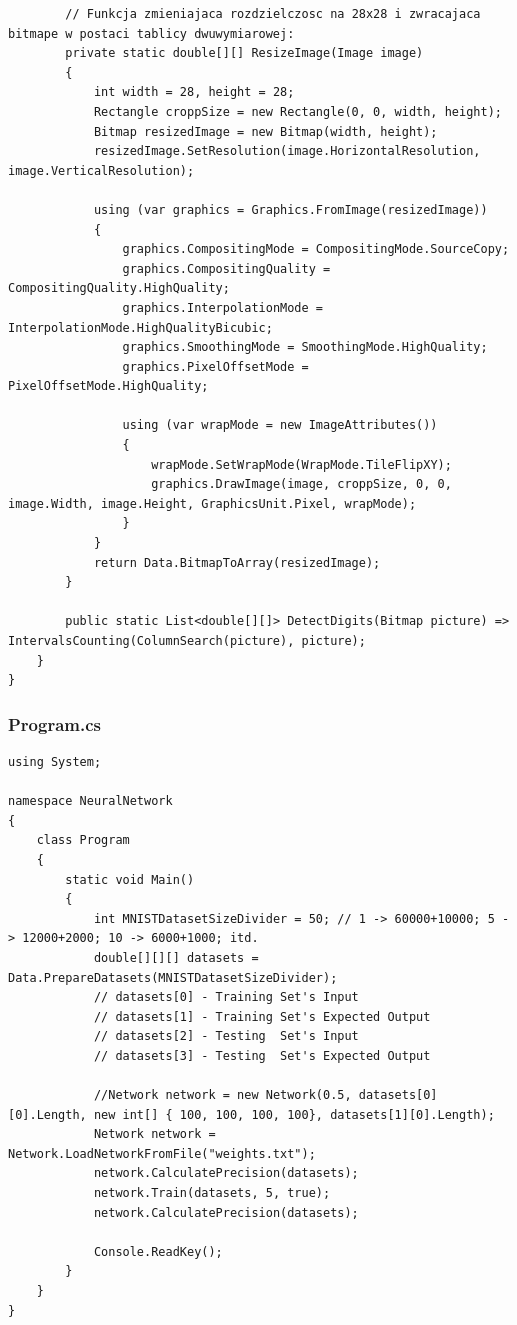 \documentclass[12pt,a4paper]{article}
\begin{document}
\begin{lstlisting}
        // Funkcja zmieniajaca rozdzielczosc na 28x28 i zwracajaca bitmape w postaci tablicy dwuwymiarowej:
        private static double[][] ResizeImage(Image image)
        {
            int width = 28, height = 28;
            Rectangle croppSize = new Rectangle(0, 0, width, height);
            Bitmap resizedImage = new Bitmap(width, height);
            resizedImage.SetResolution(image.HorizontalResolution, image.VerticalResolution);

            using (var graphics = Graphics.FromImage(resizedImage))
            {
                graphics.CompositingMode = CompositingMode.SourceCopy;
                graphics.CompositingQuality = CompositingQuality.HighQuality;
                graphics.InterpolationMode = InterpolationMode.HighQualityBicubic;
                graphics.SmoothingMode = SmoothingMode.HighQuality;
                graphics.PixelOffsetMode = PixelOffsetMode.HighQuality;

                using (var wrapMode = new ImageAttributes())
                {
                    wrapMode.SetWrapMode(WrapMode.TileFlipXY);
                    graphics.DrawImage(image, croppSize, 0, 0, image.Width, image.Height, GraphicsUnit.Pixel, wrapMode);
                }
            }
            return Data.BitmapToArray(resizedImage);
        }

        public static List<double[][]> DetectDigits(Bitmap picture) => IntervalsCounting(ColumnSearch(picture), picture);
    }
}
	\end{lstlisting}
	

\newpage	
	\subsubsection*{Program.cs}
	\begin{lstlisting}
using System;

namespace NeuralNetwork
{
    class Program
    {
        static void Main()
        {
            int MNISTDatasetSizeDivider = 50; // 1 -> 60000+10000; 5 -> 12000+2000; 10 -> 6000+1000; itd.
            double[][][] datasets = Data.PrepareDatasets(MNISTDatasetSizeDivider);
            // datasets[0] - Training Set's Input
            // datasets[1] - Training Set's Expected Output
            // datasets[2] - Testing  Set's Input
            // datasets[3] - Testing  Set's Expected Output

            //Network network = new Network(0.5, datasets[0][0].Length, new int[] { 100, 100, 100, 100}, datasets[1][0].Length);
            Network network = Network.LoadNetworkFromFile("weights.txt");
            network.CalculatePrecision(datasets);
            network.Train(datasets, 5, true);
            network.CalculatePrecision(datasets);

            Console.ReadKey();
        }
    }
}
	\end{lstlisting}
\end{document}
